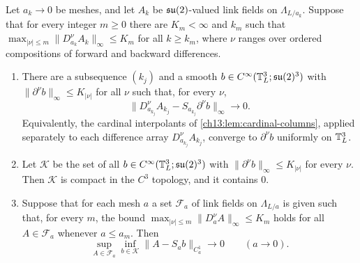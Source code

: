 \begin{lemma}\label{ch22:lem:fixed-time-compactness}
Let $a_k\to0$ be meshes, and let $A_k$ be $\mathfrak{su}(2)$-valued link fields on $\Lambda_{L/a_k}$. Suppose that for every integer $m\ge0$ there are $K_m<\infty$ and $k_m$ such that $\max_{|\nu|\le m}\|D_{a_k}^\nu A_k\|_\infty\le K_m$ for all $k\ge k_m$, where $\nu$ ranges over ordered compositions of forward and backward differences.
\begin{enumerate}
\item There are a subsequence $(k_j)$ and a smooth $b\in C^\infty(\mathbb T_L^3;\mathfrak{su}(2)^3)$ with $\|\partial^\nu b\|_\infty\le K_{|\nu|}$ for all $\nu$ such that, for every $\nu$,
\[
 \|D_{a_{k_j}}^\nu A_{k_j}-S_{a_{k_j}}\partial^\nu b\|_\infty\longrightarrow0 .
\]
Equivalently, the cardinal interpolants of \cref{ch13:lem:cardinal-columns}, applied separately to each difference array $D^\nu_{a_{k_j}}A_{k_j}$, converge to $\partial^\nu b$ uniformly on $\mathbb T_L^3$.
\item Let $\mathscr K$ be the set of all $b\in C^\infty(\mathbb T_L^3;\mathfrak{su}(2)^3)$ with $\|\partial^\nu b\|_\infty\le K_{|\nu|}$ for every $\nu$. Then $\mathscr K$ is compact in the $C^3$ topology, and it contains $0$.
\item Suppose that for each mesh $a$ a set $\mathcal F_a$ of link fields on $\Lambda_{L/a}$ is given such that, for every $m$, the bound $\max_{|\nu|\le m}\|D_a^\nu A\|_\infty\le K_m$ holds for all $A\in\mathcal F_a$ whenever $a\le a_m$. Then
\[
 \sup_{A\in\mathcal F_a}\inf_{b\in\mathscr K}\|A-S_ab\|_{C_a^1}\longrightarrow0\qquad(a\to0).
\]
\end{enumerate}
\end{lemma}

